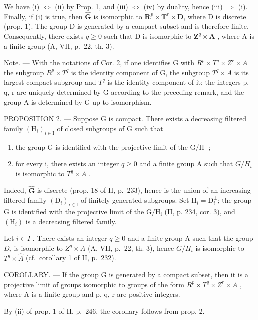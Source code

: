 We have (i) \(\Leftrightarrow\) (ii) by Prop. 1, and (iii) \(\Leftrightarrow\) (iv) by duality, hence (iii) \(\Rightarrow\) (i). Finally, if (i) is true, then \(\widehat{\mathbf{G}}\) is isomorphic to \(\mathbf{R}^{p} \times \mathbf{T}^{r} \times \mathbf{D}\), where D is discrete (prop. 1). The group D is generated by a compact subset and is therefore finite. Consequently, there exists \(q \geqslant 0\) such that D is isomorphic to \(\mathbf{Z}^{q} \times \mathbf{A}\) , where A is a finite group (A, VII, p.~22, th. 3).

Note. --- With the notations of Cor. 2, if one identifies G with \(R^{p} \times T^{q} \times Z^{r} \times A\) the subgroup \(R^{p} \times T^{q}\) is the identity component of G, the subgroup \(T^{q} \times A\) is its largest compact subgroup and \(T^{q}\) is the identity component of it; the integers p, q, r are uniquely determined by G according to the preceding remark, and the group A is determined by G up to isomorphism.

PROPOSITION 2. --- Suppose G is compact. There exists a decreasing filtered family \((\mathrm{H}_{i})_{i\in\mathrm{I}}\) of closed subgroups of G such that

\begin{enumerate}
\def\labelenumi{\alph{enumi})}
\item
  the group G is identified with the projective limit of the \(\mathrm{G / H_i}\) ;
\item
  for every i, there exists an integer \(q \geqslant 0\) and a finite group A such that \(G/H_{i}\) is isomorphic to \(T^{q} \times A\) .
\end{enumerate}

Indeed, \(\widehat{\mathbf{G}}\) is discrete (prop. 18 of II, p.~233), hence is the union of an increasing filtered family \((\mathrm{D}_i)_{i\in \mathrm{I}}\) of finitely generated subgroups. Set \(\mathrm{H}_i = \mathrm{D}_i^\perp\); the group G is identified with the projective limit of the \(\mathrm{G / H_i}\) (II, p. 234, cor. 3), and \((\mathrm{H}_i)\) is a decreasing filtered family.

Let \(i \in I\) . There exists an integer \(q \geqslant 0\) and a finite group A such that the group \(D_{i}\) is isomorphic to \(Z^{q} \times A\) (A, VII, p.~22, th. 3), hence \(G/H_{i}\) is isomorphic to \(T^{q} \times \widehat{A}\) (cf.~corollary 1 of II, p.~232).

COROLLARY. --- If the group G is generated by a compact subset, then it is a projective limit of groups isomorphic to groups of the form \(R^{p} \times T^{q} \times Z^{r} \times A\) , where A is a finite group and p, q, r are positive integers.

By (ii) of prop. 1 of II, p.~246, the corollary follows from prop. 2.

